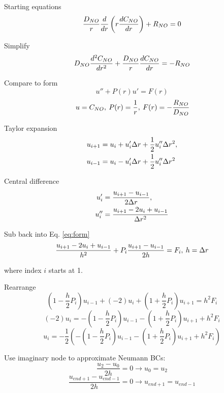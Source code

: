 \documentclass[8pt, a4paper]{article}
\begin{document}
  Starting equations
  \begin{equation}
  \frac{D_{NO}}{r} \frac{d}{dr} \left (r \frac{dC_{NO}}{dr} \right) + R_{NO} = 0
  \end{equation}
  
  Simplify
  \begin{equation}
  D_{NO} \frac{d^2C_{NO}}{dr^2} + \frac{D_{NO}}{r} \frac{dC_{NO}}{dr} = - R_{NO}
  \end{equation}
  
  Compare to form
  \begin{equation} \label{eq:form}
  u''+P(r)u'=F(r)
  \end{equation}
  \begin{equation}
  \:u=C_{NO},\:P(r)=\frac{1}{r},\:F(r)=-\frac{R_{NO}}{D_{NO}}
  \end{equation}
  
  Taylor expansion
  \begin{align*}
  u_{i+1}&=u_i+u_i'\Delta r+\frac{1}{2}u_i''\Delta r^2,\\
  u_{i-1}&=u_i-u_i'\Delta r+\frac{1}{2}u_i''\Delta r^2
  \end{align*}
  
  Central difference
  \begin{align*}
  u_i'&=\frac{u_{i+1}-u_{i-1}}{2\Delta r},\\
  u_i''&=\frac{u_{i+1}-2u_i+u_{i-1}}{\Delta r^2}
  \end{align*}
  
  Sub back into Eq. \eqref{eq:form}
  \begin{equation}
  \frac{u_{i+1}-2u_i+u_{i-1}}{h^2}+P_i\frac{u_{i+1}-u_{i-1}}{2h}=F_i,\:h=\Delta r
  \end{equation}
  
  where index $i$ starts at 1. 
  
  Rearrange
  \begin{equation}
  \left (1-\frac{h}{2}P_i \right)u_{i-1}+(-2)u_i+\left (1+\frac{h}{2}P_i 
  \right)u_{i+1}=h^2F_i
  \end{equation}
  \begin{equation}
  (-2)u_i=-\left (1-\frac{h}{2}P_i \right)u_{i-1}-\left (1+\frac{h}{2}P_i 
  \right)u_{i+1}+h^2F_i
  \end{equation}
  \begin{equation}
  u_i=-\frac{1}{2}\left(-\left (1-\frac{h}{2}P_i \right)u_{i-1}-\left 
  (1+\frac{h}{2}P_i \right)u_{i+1}+h^2F_i \right)
  \end{equation}
  
  Use imaginary node to approximate Neumann BCs:
  \begin{equation}
  \frac{u_2-u_0}{2h}=0 \rightarrow u_0 = u_2
  \end{equation}
  \begin{equation}
  \frac{u_{end+1}-u_{end-1}}{2h}=0 \rightarrow u_{end+1} = u_{end-1}
  \end{equation}
  
\end{document}

